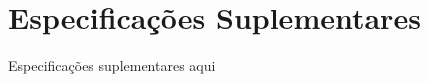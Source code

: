 \chapter[Especificações Suplementares]{Especificações Suplementares}

Especificações suplementares aqui


